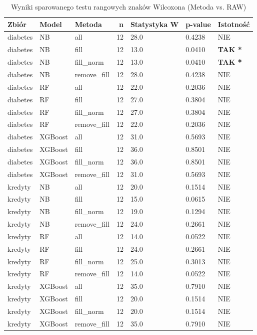 \begin{table}[htbp]
\caption{Wyniki sparowanego testu rangowych znaków Wilcoxona (Metoda vs. RAW)}
\label{tab:test_wilcoxon}
\begin{tabular}{lllrlll}
\toprule
Zbiór & Model & Metoda & n & Statystyka W & p-value & Istotność \\
\midrule
diabetes & NB & all & 12 & 28.0 & 0.4238 & NIE \\
diabetes & NB & fill & 12 & 13.0 & 0.0410 & \textbf{TAK *} \\
diabetes & NB & fill_norm & 12 & 13.0 & 0.0410 & \textbf{TAK *} \\
diabetes & NB & remove_fill & 12 & 28.0 & 0.4238 & NIE \\
diabetes & RF & all & 12 & 22.0 & 0.2036 & NIE \\
diabetes & RF & fill & 12 & 27.0 & 0.3804 & NIE \\
diabetes & RF & fill_norm & 12 & 27.0 & 0.3804 & NIE \\
diabetes & RF & remove_fill & 12 & 22.0 & 0.2036 & NIE \\
diabetes & XGBoost & all & 12 & 31.0 & 0.5693 & NIE \\
diabetes & XGBoost & fill & 12 & 36.0 & 0.8501 & NIE \\
diabetes & XGBoost & fill_norm & 12 & 36.0 & 0.8501 & NIE \\
diabetes & XGBoost & remove_fill & 12 & 31.0 & 0.5693 & NIE \\
kredyty & NB & all & 12 & 20.0 & 0.1514 & NIE \\
kredyty & NB & fill & 12 & 15.0 & 0.0615 & NIE \\
kredyty & NB & fill_norm & 12 & 19.0 & 0.1294 & NIE \\
kredyty & NB & remove_fill & 12 & 24.0 & 0.2661 & NIE \\
kredyty & RF & all & 12 & 14.0 & 0.0522 & NIE \\
kredyty & RF & fill & 12 & 24.0 & 0.2661 & NIE \\
kredyty & RF & fill_norm & 12 & 25.0 & 0.3013 & NIE \\
kredyty & RF & remove_fill & 12 & 14.0 & 0.0522 & NIE \\
kredyty & XGBoost & all & 12 & 35.0 & 0.7910 & NIE \\
kredyty & XGBoost & fill & 12 & 20.0 & 0.1514 & NIE \\
kredyty & XGBoost & fill_norm & 12 & 20.0 & 0.1514 & NIE \\
kredyty & XGBoost & remove_fill & 12 & 35.0 & 0.7910 & NIE \\

\end{tabular}
\end{table}
